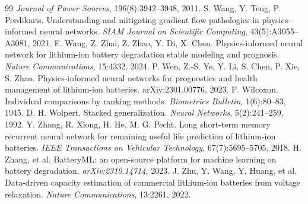 \documentclass[12pt,a4paper,oneside]{report}
\theoremstyle{plain}
\theoremstyle{definition}
\begin{document}
\begin{thebibliography}{99}
  \emph{Journal of Power Sources}, 196(8):3942--3948, 2011.
 S. Wang, Y. Teng, P. Perdikaris. Understanding and mitigating gradient flow pathologies in
  physics-informed neural networks. \emph{SIAM Journal on Scientific Computing}, 43(5):A3055--A3081, 2021.
 F. Wang, Z. Zhai, Z. Zhao, Y. Di, X. Chen. Physics-informed neural network for lithium-ion
  battery degradation stable modeling and prognosis. \emph{Nature Communications}, 15:4332, 2024.
 P. Wen, Z.-S. Ye, Y. Li, S. Chen, P. Xie, S. Zhao. Physics-informed neural networks for
  prognostics and health management of lithium-ion batteries. arXiv:2301.00776, 2023.
 F. Wilcoxon. Individual comparisons by ranking methods. \emph{Biometrics Bulletin},
  1(6):80--83, 1945.
 D. H. Wolpert. Stacked generalization. \emph{Neural Networks}, 5(2):241--259, 1992.
 Y. Zhang, R. Xiong, H. He, M. G. Pecht. Long short-term memory recurrent neural network for
  remaining useful life prediction of lithium-ion batteries. \emph{IEEE Transactions on Vehicular Technology},
  67(7):5695--5705, 2018.
 H. Zhang, et al. BatteryML: an open-source platform for machine learning on battery
  degradation. \emph{arXiv:2310.14714}, 2023.
 J. Zhu, Y. Wang, Y. Huang, et al. Data-driven capacity estimation of commercial lithium-ion
  batteries from voltage relaxation. \emph{Nature Communications}, 13:2261, 2022.
\end{thebibliography}
\end{document}
